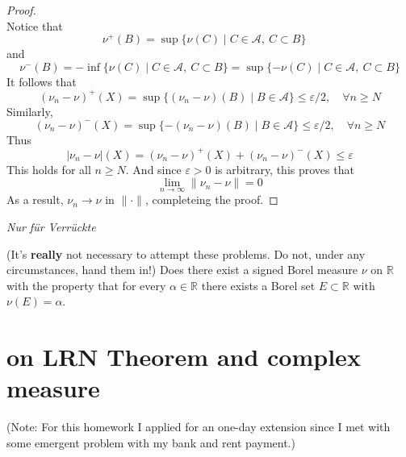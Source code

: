\documentclass[lang=cn,11pt]{elegantbook}
\begin{document}
\begin{proof}
\[\]Notice that
\[
\nu^+(B) = \sup\{\nu(C) \mid C \in \mathcal{A},\ C \subset B\}
\quad
\]and \[
\nu^-(B) =  - \inf\{\nu(C) \mid C \in \mathcal{A},\ C \subset B\}  =
\sup\{-\nu(C) \mid C \in \mathcal{A},\ C \subset B\}
\]
It follows that
\[
(\nu_n - \nu)^+(X) = \sup\{(\nu_n - \nu)(B) \mid B \in \mathcal{A}\} \le \varepsilon / 2, \quad \forall n \ge N
\]
Similarly,
\[
(\nu_n - \nu)^-(X) = \sup\{-(\nu_n - \nu)(B) \mid B \in \mathcal{A}\} \le \varepsilon /2,\quad \forall n \ge N
\]
Thus \[
|\nu_n - \nu | (X)  = (\nu_n - \nu)^+(X) + (\nu_n - \nu)^-(X) \leq \varepsilon
\]
This holds for all $n\geq N$. And since $\varepsilon > 0$ is arbitrary, this proves that \[
\lim_{n\to\infty} \|\nu_n - \nu\| = 0
\]
As a result, $\nu_n \to \nu$ in $\|\cdot\|$, completeing the proof.
\end{proof}



\vspace*{10mm}
\begin{center}
  \textit{Nur f\"ur Verr\"uckte}
\end{center}
(It's \textbf{really} not necessary to attempt these problems. Do not, under any circumstances, hand them in!)
Does there exist a signed Borel measure $\nu$ on $\mathbb{R}$ with the property that  for every $\alpha\in \mathbb{R}$ there exists a Borel set $E\subset\mathbb{R}$ with $\nu(E)=\alpha$.










\chapter{on LRN Theorem and complex measure}
(Note: For this homework I applied for an one-day extension since I met with some emergent problem with my bank and rent payment.)
\end{document}
